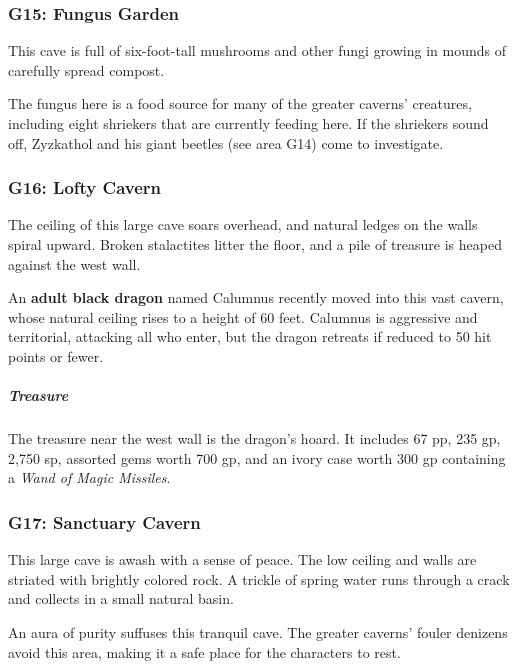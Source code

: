 \documentclass[10pt,a4paper,twoside,bg=print,twocolumn,openany,nodeprecatedcode]{dndbook}
\begin{document}
\subsubsection{G15: Fungus Garden}
\begin{DndReadAloud}{}
This cave is full of six-foot-tall mushrooms and other fungi growing in mounds of carefully spread compost.

\end{DndReadAloud}

The fungus here is a food source for many of the greater caverns' creatures, including eight shriekers that are currently feeding here. If the shriekers sound off, Zyzkathol and his giant beetles (see area G14) come to investigate.

\subsubsection{G16: Lofty Cavern}
\begin{DndReadAloud}{}
The ceiling of this large cave soars overhead, and natural ledges on the walls spiral upward. Broken stalactites litter the floor, and a pile of treasure is heaped against the west wall.

\end{DndReadAloud}

An \textbf{adult black dragon} named Calumnus recently moved into this vast cavern, whose natural ceiling rises to a height of 60 feet. Calumnus is aggressive and territorial, attacking all who enter, but the dragon retreats if reduced to 50 hit points or fewer.

\subparagraph{Treasure}
The treasure near the west wall is the dragon's hoard. It includes 67 pp, 235 gp, 2,750 sp, assorted gems worth 700 gp, and an ivory case worth 300 gp containing a \textit{Wand of Magic Missiles}.

\subsubsection{G17: Sanctuary Cavern}
\begin{DndReadAloud}{}
This large cave is awash with a sense of peace. The low ceiling and walls are striated with brightly colored rock. A trickle of spring water runs through a crack and collects in a small natural basin.

\end{DndReadAloud}

An aura of purity suffuses this tranquil cave. The greater caverns' fouler denizens avoid this area, making it a safe place for the characters to rest.
\end{document}
